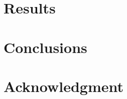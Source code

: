 \documentclass[conference]{IEEEtran}
\begin{document}
\section{Results}

\section{Conclusions}

\section*{Acknowledgment}



\begin{thebibliography}{00}

\end{thebibliography}
\end{document}
